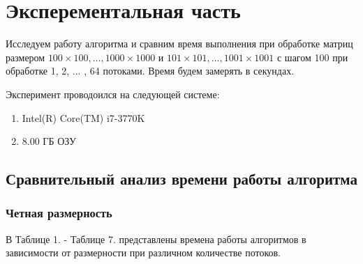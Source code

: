 \documentclass[12pt]{report}
\begin{document}
	\chapter{Эксперементальная часть}
	
	Исследуем работу алгоритма и сравним время выполнения при обработке матриц размером $ 100\times100,\dots, 1000\times1000$ и $ 101\times101,\dots, 1001\times1001$ с шагом 100 при обработке 1, 2, ... , 64 потоками. Время будем замерять в секундах.
	
	Эксперимент проводоился на следующей системе:
	\begin{enumerate}
		\item Intel(R) Core(TM) i7-3770K
		\item 8.00 ГБ ОЗУ
	\end{enumerate}
	
	\section{Сравнительный анализ времени работы алгоритма}
	
	\subsection{Четная размерность}
	
	В Таблице 1. - Таблице 7. представлены времена работы алгоритмов в зависимости от размерности при различном количестве потоков.
	~\\
	
\end{document}

